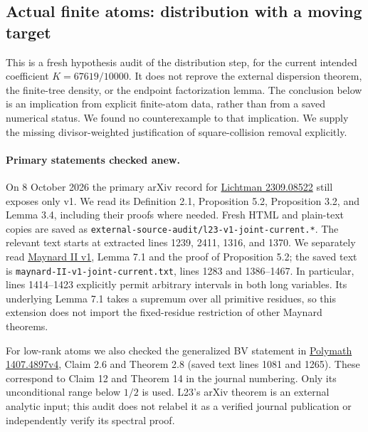\subsection{Actual finite atoms: distribution with a moving target}
\label{sec:actual-k-distribution-joint-audit}

This is a fresh hypothesis audit of the distribution step, for the
current intended coefficient $K=67619/10000$. It does not reprove the
external dispersion theorem, the finite-tree density, or the endpoint
factorization lemma. The conclusion below is an implication from
explicit finite-atom data, rather than from a saved numerical status.
We found no counterexample to that implication. We supply the missing
divisor-weighted justification of square-collision removal explicitly.

\paragraph{Primary statements checked anew.}
On 8 October 2026 the primary arXiv record for
\href{https://arxiv.org/abs/2309.08522}{Lichtman 2309.08522}
still exposes only v1. We read its Definition 2.1, Proposition 5.2,
Proposition 3.2, and Lemma 3.4, including their proofs where needed.
Fresh HTML and plain-text copies are saved as
\texttt{external-source-audit/l23-v1-joint-current.*}.
The relevant text starts at extracted lines 1239, 2411, 1316, and 1370.
We separately read
\href{https://arxiv.org/html/2006.07088v1}{Maynard II v1},
Lemma 7.1 and the proof of Proposition 5.2; the saved text is
\texttt{maynard-II-v1-joint-current.txt}, lines 1283 and 1386--1467.
In particular, lines 1414--1423 explicitly permit arbitrary intervals
in both long variables. Its underlying Lemma 7.1 takes a supremum over
all primitive residues, so this extension does not import the
fixed-residue restriction of other Maynard theorems.

For low-rank atoms we also checked the generalized BV statement in
\href{https://arxiv.org/html/1407.4897v4}{Polymath 1407.4897v4},
Claim 2.6 and Theorem 2.8 (saved text lines 1081 and 1265).
These correspond to Claim 12 and Theorem 14 in the journal numbering.
Only its unconditional range below $1/2$ is used. L23's arXiv theorem
is an external analytic input; this audit does not relabel it as a
verified journal publication or independently verify its spectral proof.

